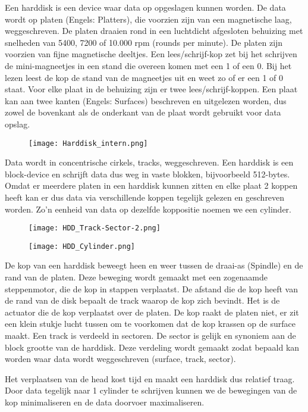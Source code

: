 Een harddisk is een device waar data op opgeslagen kunnen worden. De data wordt op platen (Engels: Platters), die voorzien zijn van een magnetische laag, weggeschreven. De platen draaien rond in een luchtdicht afgesloten behuizing met snelheden van 5400, 7200 of 10.000 rpm (rounds per minute). De platen zijn voorzien van fijne magnetische deeltjes. Een lees/schrijf-kop zet bij het schrijven de mini-magneetjes in een stand die overeen komen met een 1 of een 0. Bij het lezen leest de kop de stand van de magneetjes uit en weet zo of er een 1 of 0 staat. Voor elke plaat in de behuizing zijn er twee lees/schrijf-koppen. Een plaat kan aan twee kanten (Engels: Surfaces) beschreven en uitgelezen worden, dus zowel de bovenkant als de onderkant van de plaat wordt gebruikt voor data opslag.

\begin{figure}
\texttt{[image: Harddisk\_intern.png]}
\end{figure}

Data wordt in concentrische cirkels, tracks, weggeschreven. Een harddisk is een block-device en schrijft data dus weg in vaste blokken, bijvoorbeeld 512-bytes. Omdat er meerdere platen in een harddisk kunnen zitten en elke plaat 2 koppen heeft kan er dus data via verschillende koppen tegelijk gelezen en geschreven worden. Zo'n eenheid van data op dezelfde koppositie noemen we een cylinder. 

\begin{figure}
\texttt{[image: HDD\_Track-Sector-2.png]}
\end{figure}

\begin{figure}
\texttt{[image: HDD\_Cylinder.png]}
\end{figure}

De kop van een harddisk beweegt heen en weer tussen de draai-as (Spindle) en de rand van de platen. Deze beweging wordt gemaakt met een zogenaamde steppenmotor, die de kop in stappen verplaatst. De afstand die de kop heeft van de rand van de disk bepaalt de track waarop de kop zich bevindt. Het is de actuator die de kop verplaatst over de platen. De kop raakt de platen niet, er zit een klein stukje lucht tussen om te voorkomen dat de kop krassen op de surface maakt. Een track is verdeeld in sectoren. De sector is gelijk en synoniem aan de block grootte van de harddisk. Deze verdeling wordt gemaakt zodat bepaald kan worden waar data wordt weggeschreven (surface, track, sector).

Het verplaatsen van de head kost tijd en maakt een harddisk dus relatief traag. Door data tegelijk naar 1 cylinder te schrijven kunnen we de bewegingen van de kop minimaliseren en de data doorvoer maximaliseren.
